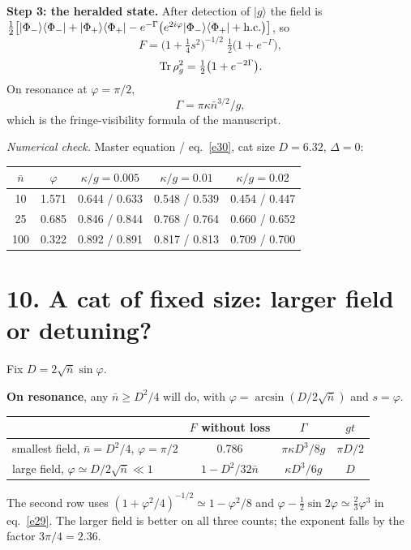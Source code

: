 \documentclass[11pt,letterpaper]{article}
\newcommand{\nbar}{\bar{n}}
\newcommand{\ket}[1]{|#1\rangle}
\newcommand{\bra}[1]{\langle#1|}
\newcommand{\numcheck}[1]{\par{\small\textit{Numerical check.} #1}\par}
\begin{document}
\textbf{Step 3: the heralded state.} After detection of $\ket{g}$ the field is
$\tfrac12\bigl[\ket{\Phi_-}\bra{\Phi_-}+\ket{\Phi_+}\bra{\Phi_+}-e^{-\Gamma}\bigl(e^{2i\varphi}\ket{\Phi_-}\bra{\Phi_+}+{\rm h.c.}\bigr)\bigr]$, so
\begin{equation}\label{e30}
F=\bigl(1+\tfrac14s^2\bigr)^{-1/2}\;\tfrac12\bigl(1+e^{-\Gamma}\bigr),
\end{equation}
\begin{equation}\label{e31}
{\rm Tr}\,\rho_g^2=\tfrac12\bigl(1+e^{-2\Gamma}\bigr).
\end{equation}
On resonance at $\varphi=\pi/2$,
\begin{equation}\label{e32}
\Gamma=\pi\kappa\nbar^{3/2}/g ,
\end{equation}
which is the fringe-visibility formula of the manuscript.
\numcheck{Master equation / eq.~\eqref{e30}, cat size $D=6.32$, $\Delta=0$:}
\begin{center}\small
\begin{tabular}{@{}ccccc@{}}
\toprule
$\nbar$ & $\varphi$ & $\kappa/g=0.005$ & $\kappa/g=0.01$ & $\kappa/g=0.02$\\
\midrule
10 & 1.571 & 0.644 / 0.633 & 0.548 / 0.539 & 0.454 / 0.447\\
25 & 0.685 & 0.846 / 0.844 & 0.768 / 0.764 & 0.660 / 0.652\\
100 & 0.322 & 0.892 / 0.891 & 0.817 / 0.813 & 0.709 / 0.700\\
\bottomrule
\end{tabular}
\end{center}

\section*{10. A cat of fixed size: larger field or detuning?}
Fix $D=2\sqrt{\nbar}\sin\varphi$.

\textbf{On resonance}, any $\nbar\ge D^2/4$ will do, with $\varphi=\arcsin(D/2\sqrt{\nbar})$ and $s=\varphi$.
\begin{center}\small
\begin{tabular}{@{}lccc@{}}
\toprule
 & $F$ without loss & $\Gamma$ & $gt$\\
\midrule
smallest field, $\nbar=D^2/4$, $\varphi=\pi/2$ & 0.786 & $\pi\kappa D^3/8g$ & $\pi D/2$\\
large field, $\varphi\simeq D/2\sqrt{\nbar}\ll1$ & $1-D^2/32\nbar$ & $\kappa D^3/6g$ & $D$\\
\bottomrule
\end{tabular}
\end{center}
The second row uses $(1+\varphi^2/4)^{-1/2}\simeq1-\varphi^2/8$ and
$\varphi-\tfrac12\sin2\varphi\simeq\tfrac23\varphi^3$ in eq.~\eqref{e29}. The larger field is better on all
three counts; the exponent falls by the factor $3\pi/4=2.36$.
\end{document}
